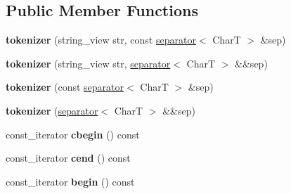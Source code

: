 \subsection*{Public Member Functions}
\begin{DoxyCompactItemize}
\item 
\mbox{\label{classouchi_1_1tokenizer_1_1tokenizer_ae0dc2880a9a1fb8c7252baaa4019ea72}} 
{\bfseries tokenizer} (string\+\_\+view str, const \mbox{\hyperlink{classouchi_1_1tokenizer_1_1separator}{separator}}$<$ CharT $>$ \&sep)
\item 
\mbox{\label{classouchi_1_1tokenizer_1_1tokenizer_a0e00772ef3ff5cda5531c63f5d5cc6d1}} 
{\bfseries tokenizer} (string\+\_\+view str, \mbox{\hyperlink{classouchi_1_1tokenizer_1_1separator}{separator}}$<$ CharT $>$ \&\&sep)
\item 
\mbox{\label{classouchi_1_1tokenizer_1_1tokenizer_a1bff064e84cb28a72aa4e9559252b77d}} 
{\bfseries tokenizer} (const \mbox{\hyperlink{classouchi_1_1tokenizer_1_1separator}{separator}}$<$ CharT $>$ \&sep)
\item 
\mbox{\label{classouchi_1_1tokenizer_1_1tokenizer_a00c3be2b09bbe8c9acbb6db49bcc66fb}} 
{\bfseries tokenizer} (\mbox{\hyperlink{classouchi_1_1tokenizer_1_1separator}{separator}}$<$ CharT $>$ \&\&sep)
\item 
\mbox{\label{classouchi_1_1tokenizer_1_1tokenizer_a513160763d44dd0811cbe855e736637c}} 
const\+\_\+iterator {\bfseries cbegin} () const
\item 
\mbox{\label{classouchi_1_1tokenizer_1_1tokenizer_a7e0734d2c5f5565e02135e0427658f06}} 
const\+\_\+iterator {\bfseries cend} () const
\item 
\mbox{\label{classouchi_1_1tokenizer_1_1tokenizer_a1d9d466cb1ff68081cbe0c18105a7c4f}} 
const\+\_\+iterator {\bfseries begin} () const
\item 
\mbox{\label{classouchi_1_1tokenizer_1_1tokenizer_ac12a90068205831e8a70f648b3a1818c}} 

\end{DoxyCompactItemize}
